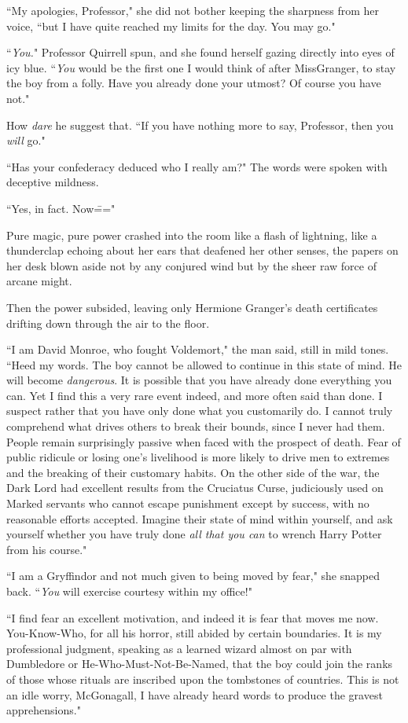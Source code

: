 ``My apologies, Professor," she did not bother keeping the sharpness from her voice, ``but I have quite reached my limits for the day. You may go."

``\emph{You.}" Professor Quirrell spun, and she found herself gazing directly into eyes of icy blue. ``\emph{You} would be the first one I would think of after Miss\?Granger, to stay the boy from a folly. Have you already done your utmost? Of course you have not."

How \emph{dare} he suggest that. ``If you have nothing more to say, Professor, then you \emph{will} go."

``Has your confederacy deduced who I really am?" The words were spoken with deceptive mildness.

``Yes, in fact. Now\==="

Pure magic, pure power crashed into the room like a flash of lightning, like a thunderclap echoing about her ears that deafened her other senses, the papers on her desk blown aside not by any conjured wind but by the sheer raw force of arcane might.

Then the power subsided, leaving only Hermione Granger's death certificates drifting down through the air to the floor.

``I am David Monroe, who fought Voldemort," the man said, still in mild tones. ``Heed my words. The boy cannot be allowed to continue in this state of mind. He will become \emph{dangerous}. It is possible that you have already done everything you can. Yet I find this a very rare event indeed, and more often said than done. I suspect rather that you have only done what you customarily do. I cannot truly comprehend what drives others to break their bounds, since I never had them. People remain surprisingly passive when faced with the prospect of death. Fear of public ridicule or losing one's livelihood is more likely to drive men to extremes and the breaking of their customary habits. On the other side of the war, the Dark Lord had excellent results from the Cruciatus Curse, judiciously used on Marked servants who cannot escape punishment except by success, with no reasonable efforts accepted. Imagine their state of mind within yourself, and ask yourself whether you have truly done \emph{all that you can} to wrench Harry Potter from his course."

``I am a Gryffindor and not much given to being moved by fear," she snapped back. ``\emph{You} will exercise courtesy within my office!"

``I find fear an excellent motivation, and indeed it is fear that moves me now. You-Know-Who, for all his horror, still abided by certain boundaries. It is my professional judgment, speaking as a learned wizard almost on par with Dumbledore or He-Who-Must-Not-Be-Named, that the boy could join the ranks of those whose rituals are inscribed upon the tombstones of countries. This is not an idle worry, McGonagall, I have already heard words to produce the gravest apprehensions."


